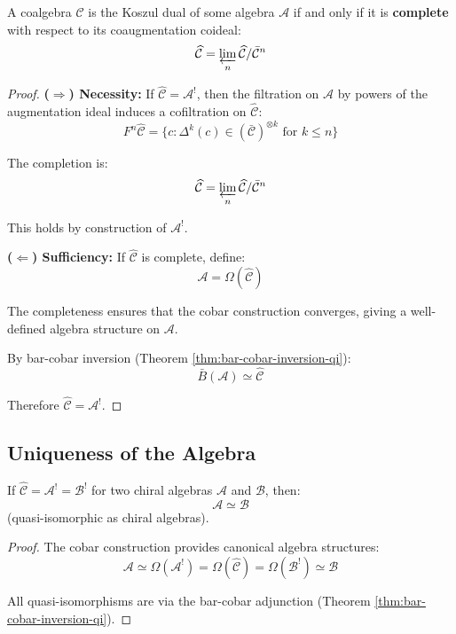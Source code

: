 \begin{theorem}\label{thm:completion-characterization}
A coalgebra $\widehat{\mathcal{C}}$ is the Koszul dual of some algebra $\mathcal{A}$ 
if and only if it is \textbf{complete} with respect to its coaugmentation coideal:
$$\widehat{\mathcal{C}} = \varprojlim_n \widehat{\mathcal{C}} / \bar{\mathcal{C}}^n$$
\end{theorem}

\begin{proof}
\textbf{($\Rightarrow$) Necessity:}
If $\widehat{\mathcal{C}} = \mathcal{A}^!$, then the filtration on $\mathcal{A}$ by 
powers of the augmentation ideal induces a cofiltration on $\widehat{\mathcal{C}}$:
$$F^n\widehat{\mathcal{C}} = \{c : \Delta^k(c) \in (\bar{\mathcal{C}})^{\otimes k} 
\text{ for } k \leq n\}$$

The completion is:
$$\widehat{\mathcal{C}} = \varprojlim_n \widehat{\mathcal{C}} / \bar{\mathcal{C}}^n$$

This holds by construction of $\mathcal{A}^!$.

\textbf{($\Leftarrow$) Sufficiency:}
If $\widehat{\mathcal{C}}$ is complete, define:
$$\mathcal{A} = \Omega(\widehat{\mathcal{C}})$$

The completeness ensures that the cobar construction converges, giving a well-defined 
algebra structure on $\mathcal{A}$.

By bar-cobar inversion (Theorem \ref{thm:bar-cobar-inversion-qi}):
$$\bar{B}(\mathcal{A}) \simeq \widehat{\mathcal{C}}$$

Therefore $\widehat{\mathcal{C}} = \mathcal{A}^!$.
\end{proof}

\subsection{Uniqueness of the Algebra}

\begin{theorem}\label{thm:uniqueness-algebra}
If $\widehat{\mathcal{C}} = \mathcal{A}^! = \mathcal{B}^!$ for two chiral algebras 
$\mathcal{A}$ and $\mathcal{B}$, then:
$$\mathcal{A} \simeq \mathcal{B}$$
(quasi-isomorphic as chiral algebras).
\end{theorem}

\begin{proof}
The cobar construction provides canonical algebra structures:
$$\mathcal{A} \simeq \Omega(\mathcal{A}^!) = \Omega(\widehat{\mathcal{C}}) = 
\Omega(\mathcal{B}^!) \simeq \mathcal{B}$$

All quasi-isomorphisms are via the bar-cobar adjunction (Theorem \ref{thm:bar-cobar-inversion-qi}).
\end{proof}

